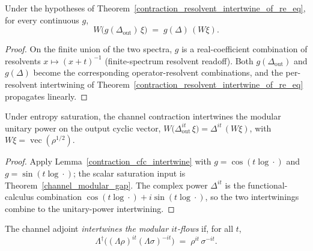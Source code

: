 \begin{lemma}\label{contraction_cfc_intertwine}
  \leanok
  Under the hypotheses of Theorem~\ref{contraction_resolvent_intertwine_of_re_eq}, for every
  continuous \(g\),
  \[
    W\bigl(g(\Delta_{\mathrm{out}})\,\xi\bigr) \;=\; g(\Delta)\,(W\xi).
  \]
\end{lemma}
\begin{proof}\leanok
  On the finite union of the two spectra, \(g\) is a real-coefficient combination of resolvents
  \(x\mapsto(x+t)^{-1}\) (finite-spectrum resolvent readoff). Both \(g(\Delta_{\mathrm{out}})\) and
  \(g(\Delta)\) become the corresponding operator-resolvent combinations, and the per-resolvent
  intertwining of Theorem~\ref{contraction_resolvent_intertwine_of_re_eq} propagates linearly.
\end{proof}

\begin{theorem}\label{channel_upow_intertwine}
  \leanok
  Under entropy saturation, the channel contraction intertwines the modular unitary power on the
  output cyclic vector, \(W\bigl(\Delta_{\mathrm{out}}^{it}\,\xi\bigr)=\Delta^{it}\,(W\xi)\), with
  \(W\xi=\operatorname{vec}(\rho^{1/2})\).
\end{theorem}
\begin{proof}\leanok
  Apply Lemma~\ref{contraction_cfc_intertwine} with \(g=\cos(t\log\cdot)\) and \(g=\sin(t\log\cdot)\);
  the scalar saturation input is Theorem~\ref{channel_modular_gap}. The complex power \(\Delta^{it}\)
  is the functional-calculus combination \(\cos(t\log\cdot)+i\sin(t\log\cdot)\), so the two
  intertwinings combine to the unitary-power intertwining.
\end{proof}

\begin{definition}\label{IntertwinesIt}
  \leanok
  The channel adjoint \emph{intertwines the modular \(it\)-flows} if, for all \(t\),
  \[
    \Lambda^{\dagger}\bigl((\Lambda\rho)^{it}(\Lambda\sigma)^{-it}\bigr) \;=\; \rho^{it}\,\sigma^{-it}.
  \]
\end{definition}

